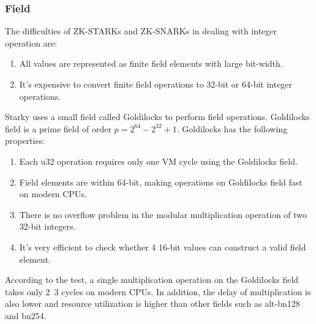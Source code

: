 \subsubsection{Field}\label{section: starky-field}

\noindent The difficulties of ZK-STARKs and ZK-SNARKs in dealing with integer operation are:

\begin{enumerate}
    \item All values are represented as finite field elements with large bit-width.
    \item It's expensive to convert finite field operations to 32-bit or 64-bit integer operations.
\end{enumerate}

\noindent Starky uses a small field called Goldilocks to perform field operations. Goldilocks field is a prime field of order $p = 2^{64} - 2^{32} + 1$. Goldilocks has the following properties:

\begin{enumerate}
    \item Each u32 operation requires only one VM cycle using the Goldilocks field.
    \item Field elements are within 64-bit, making operations on Goldilocks field fast on modern CPUs.
    \item There is no overflow problem in the modular multiplication operation of two 32-bit integers.
    \item It's very efficient to check whether 4 16-bit values can construct a valid field element.
\end{enumerate}

According to the test, a single multiplication operation on the Goldilocks field takes only 2~3 cycles on modern CPUs. In addition, the delay of multiplication is also lower and resource utilization is higher than other fields such as alt-bn128 and bn254.